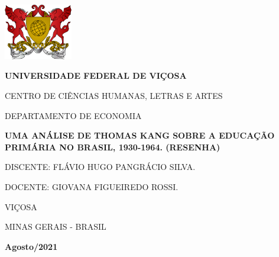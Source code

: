 \begin{minipage}{.1\linewidth}
    \includegraphics[width=3cm]{ufv2.png}
\end{minipage}
\begin{minipage}{.9\linewidth}

\thispagestyle{empty}

\begin{center}
\textbf{UNIVERSIDADE FEDERAL DE VIÇOSA}

CENTRO DE CIÊNCIAS HUMANAS, LETRAS E ARTES

DEPARTAMENTO DE ECONOMIA
\end{center}
\end{minipage}


\vspace{4cm}

\begin{center}

    \textbf{UMA ANÁLISE DE THOMAS KANG SOBRE A EDUCAÇÃO PRIMÁRIA NO BRASIL, 1930-1964. (RESENHA)}
\end{center}

\vspace{4cm}

\begin{flushright}
DISCENTE: FLÁVIO HUGO PANGRÁCIO SILVA.

\vspace{0.5cm}

DOCENTE: GIOVANA FIGUEIREDO  ROSSI.
\end{flushright}

\vspace{6cm}

\begin{center}

VIÇOSA

MINAS GERAIS - BRASIL

\textbf{Agosto/2021}
    
\end{center}